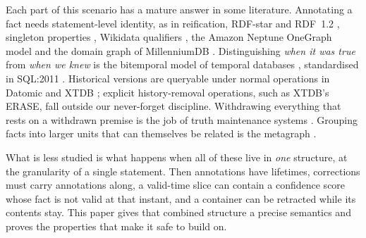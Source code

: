 \documentclass[11pt]{article}
\theoremstyle{plain}
\theoremstyle{definition}
\theoremstyle{remark}
\begin{document}
Each part of this scenario has a mature answer in some literature. Annotating
a fact needs statement-level identity, as in reification, RDF-star and RDF~1.2
\cite{hartig2017rdfstar,w3c2026rdf12concepts}, singleton properties
\cite{nguyen2014singleton}, Wikidata qualifiers \cite{hernandez2015reifying},
the Amazon Neptune OneGraph model \cite{lassila2023onegraph} and the domain graph
of MillenniumDB \cite{vrgoc2023millenniumdb}. Distinguishing \emph{when it was
true} from \emph{when we knew} is the bitemporal model of temporal databases
\cite{snodgrass1985taxonomy,jensen1994unifying,jensen1998glossary,snodgrass1999developing},
standardised in SQL:2011 \cite{kulkarni2012temporal}. Historical versions are queryable under normal operations in Datomic
\cite{datomic} and XTDB \cite{xtdb}; explicit history-removal operations,
such as XTDB's ERASE, fall outside our never-forget discipline. Withdrawing everything that rests on a withdrawn premise is the
job of truth maintenance systems \cite{doyle1979tms,dekleer1986atms}.
Grouping facts into larger units that can themselves be related is the
metagraph \cite{basu2007metagraphs,chernenkiy2017rdf,gapanyuk2021development,goertzel2020folding}.

What is less studied is what happens when all of these live in \emph{one}
structure, at the granularity of a single statement. Then annotations have
lifetimes, corrections must carry annotations along, a valid-time slice can
contain a confidence score whose fact is not valid at that instant, and a
container can be retracted while its contents stay. This paper gives that
combined structure a precise semantics and proves the properties that make it
safe to build on.
\end{document}
